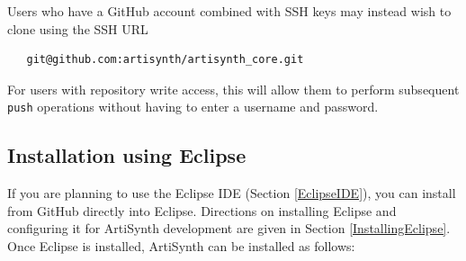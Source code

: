 \begin{sideblock}
Users who have a GitHub account combined with SSH keys may instead
wish to clone using the SSH URL
\begin{verbatim}
   git@github.com:artisynth/artisynth_core.git
\end{verbatim}
For users with repository write access, this will allow them to
perform subsequent {\tt push} operations without having to
enter a username and password.
\end{sideblock}

\subsection{Installation using Eclipse}
\label{EclipseInstallation}

If you are planning to use the Eclipse IDE (Section \ref{EclipseIDE}),
you can install from GitHub directly into Eclipse.  Directions on
installing Eclipse and configuring it for ArtiSynth development are
given in Section
\ref{InstallingEclipse}.
Once Eclipse is installed, ArtiSynth can be installed
as follows:

